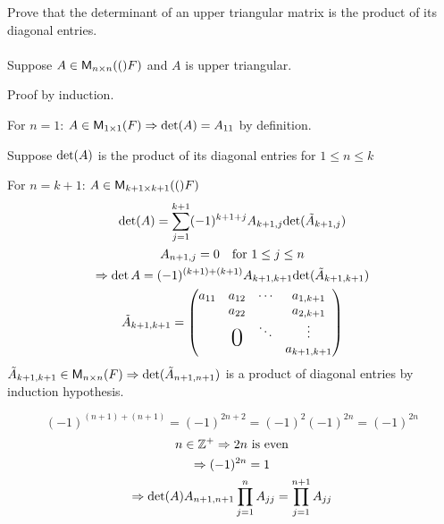 Prove that the determinant of an upper triangular matrix is the
product of its diagonal entries.
\paragraph{}
Suppose $A \in \mathsf{M}_{n \times n}(()F)$ and $A$ is upper triangular.

Proof by induction.

For $n=1$: $A\in \mathsf{M}_{1 \times 1}(F)\Rightarrow \text{det}({A}) = A_{11}$ by definition.

Suppose $\text{det}({A})$ is the product of its diagonal entries for $1\leq
n\leq k$ 

For $n=k+1$: $A \in \mathsf{M}_{k+1 \times k+1}(()F)$
\begin{gather}
\dete{A} = \sum\limits_{j=1}^{k+1} (-1)^{k+1+j} A_{k+1,j}
\dete{\tilde{A}_{k+1,j}}\\
A_{n+1,j} = 0 \quad \text{for } 1\leq j\leq n\\
\implies \det{A} = (-1)^{(k+1)+(k+1)}
A_{k+1,k+1}\dete{\tilde{A}_{k+1,k+1}}\\
\tilde{A}_{k+1,k+1} = \begin{pmatrix}
a_{11} & a_{12} & \cdots & a_{1,k+1}\\
     & a_{22} &        & a_{2,k+1}\\
      &\bigzero& \ddots & \vdots\\
      &&        & a_{k+1,k+1}
\end{pmatrix}
\end{gather}
$\tilde{A}_{k+1,k+1} \in \mathsf{M}_{n \times n}(F) \Rightarrow
\text{det}({\tilde{A}_{n+1,n+1}})$ is a product of diagonal entries by
induction hypothesis.

\begin{equation}
(-1)^{(n+1)+(n+1)} = (-1)^{2n+2} = (-1)^2(-1)^{2n} = (-1)^{2n}
\end{equation}
\begin{gather}
n \in \mathbb{Z}^+ \Rightarrow 2n \text{ is even}\\
\Rightarrow (-1)^{2n} = 1\\
\Rightarrow \text{det}({A}) A_{n+1,n+1} \prod\limits_{j=1}^n A_{jj} = \prod\limits_{j=1}^{n+1}A_{jj} 
\end{gather}
